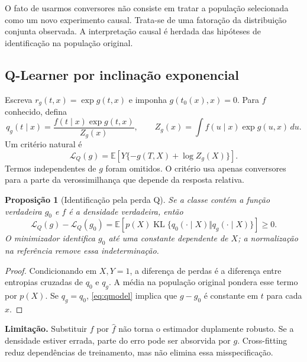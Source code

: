 \documentclass[11pt,a4paper]{article}
\newtheorem{theorem}{Proposição}[section]
\newcommand{\E}{\mathbb E}
\newcommand{\KL}{\operatorname{KL}}
\begin{document}
O fato de usarmos conversores não consiste em tratar a população selecionada como um novo experimento causal. Trata-se de uma fatoração da distribuição conjunta observada. A interpretação causal é herdada das hipóteses de identificação na população original.

\subsection{Q-Learner por inclinação exponencial}
Escreva $r_g(t,x)=\exp g(t,x)$ e imponha $g(t_0(x),x)=0$. Para $f$ conhecido, defina
\begin{equation}
q_g(t\mid x)=\frac{f(t\mid x)\exp g(t,x)}{Z_g(x)},\qquad
Z_g(x)=\int f(u\mid x)\exp g(u,x)\,du.
\label{eq:qmodel}
\end{equation}
Um critério natural é
\begin{equation}
\mathcal L_Q(g)=\E\left[Y\{-g(T,X)+\log Z_g(X)\}\right].
\label{eq:qloss}
\end{equation}
Termos independentes de $g$ foram omitidos. O critério usa apenas conversores para a parte da verossimilhança que depende da resposta relativa.

\begin{theorem}[Identificação pela perda Q]
Se a classe contém a função verdadeira $g_0$ e $f$ é a densidade verdadeira, então
\[
\mathcal L_Q(g)-\mathcal L_Q(g_0)
=\E\left[p(X)\KL\{q_0(\cdot\mid X)\Vert q_g(\cdot\mid X)\}\right]\geq0.
\]
O minimizador identifica $g_0$ até uma constante dependente de $X$; a normalização na referência remove essa indeterminação.
\end{theorem}
\begin{proof}
Condicionando em $X,Y=1$, a diferença de perdas é a diferença entre entropias cruzadas de $q_0$ e $q_g$. A média na população original pondera esse termo por $p(X)$. Se $q_g=q_0$, \eqref{eq:qmodel} implica que $g-g_0$ é constante em $t$ para cada $x$.
\end{proof}
\noindent\textbf{Limitação.} Substituir $f$ por $\hat f$ não torna o estimador duplamente robusto. Se a densidade estiver errada, parte do erro pode ser absorvida por $g$. Cross-fitting reduz dependências de treinamento, mas não elimina essa misspecificação.
\end{document}

